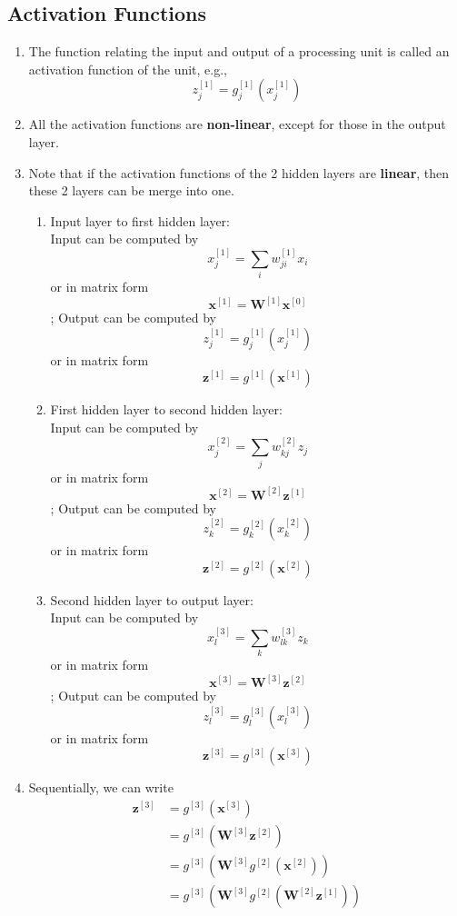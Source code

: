 \documentclass[11pt]{article}
\begin{document}
\subsection{Activation Functions}
\begin{enumerate}
\item The function relating the input and output of a processing unit is called an activation function of the unit, e.g., $$z_{j}^{[1]} = g_{j}^{[1]}(x^{[1]}_j)$$
\item All the activation functions are \textbf{non-linear}, except for those in the output layer.
\item Note that if the activation functions of the 2 hidden layers are \textbf{linear}, then these 2 layers can be merge into one.
\begin{enumerate}
\item Input layer to first hidden layer: \\Input can be computed by $$x^{[1]}_j = \sum_{i} w^{[1]}_{ji} x_i$$ or in matrix form $$\mathbf{x}^{[1]} = \mathbf{W}^{[1]} \mathbf{x}^{[0]}$$; Output can be computed by $$z_{j}^{[1]} = g^{[1]}_{j} (x^{[1]}_{j})$$ or in matrix form $$\mathbf{z}^{[1]} = g^{[1]}(\mathbf{x}^{[1]})$$
\item First hidden layer to second hidden layer: \\Input can be computed by $$x^{[2]}_j = \sum_{j} w^{[2]}_{kj} z_j$$ or in matrix form $$\mathbf{x}^{[2]} = \mathbf{W}^{[2]} \mathbf{z}^{[1]}$$; Output can be computed by $$z_{k}^{[2]} = g^{[2]}_{k} (x^{[2]}_{k})$$ or in matrix form $$\mathbf{z}^{[2]} = g^{[2]}(\mathbf{x}^{[2]})$$
\item Second hidden layer to output layer: \\Input can be computed by $$x^{[3]}_l = \sum_{k} w^{[3]}_{lk} z_k$$ or in matrix form $$\mathbf{x}^{[3]} = \mathbf{W}^{[3]} \mathbf{z}^{[2]}$$; Output can be computed by $$z_{l}^{[3]} = g^{[3]}_{l} (x^{[3]}_{l})$$ or in matrix form $$\mathbf{z}^{[3]} = g^{[3]}(\mathbf{x}^{[3]})$$
\end{enumerate}
\item[] Sequentially, we can write \begin{align*}
\mathbf{z}^{[3]} &= g^{[3]}(\mathbf{x}^{[3]})\\
&=g^{[3]}(\mathbf{W}^{[3]} \mathbf{z}^{[2]})\\
&= g^{[3]}(\mathbf{W}^{[3]} g^{[2]}(\mathbf{x}^{[2]}))\\
&= g^{[3]}(\mathbf{W}^{[3]} g^{[2]}(\mathbf{W}^{[2]} \mathbf{z}^{[1]}))\\

\end{align*}
\end{enumerate}
\end{document}
